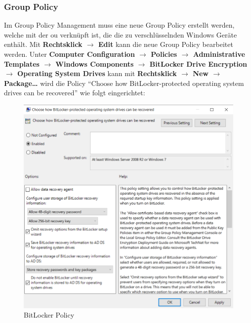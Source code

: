 \subsubsection{Group Policy}
Im Group Policy Management muss eine neue Group Policy erstellt werden, welche mit der \acrshort{ou} verknüpft ist, die die zu verschlüsselnden Windows Geräte enthält.
Mit \textbf{Rechtsklick $\rightarrow$ Edit} kann die neue Group Policy bearbeitet werden.
Unter \textbf{Computer Configuration $\rightarrow$ Policies $\rightarrow$ Administrative Templates $\rightarrow$ Windows Components $\rightarrow$ BitLocker Drive Encryption $\rightarrow$ Operating System Drives} kann mit \textbf{Rechtsklick $\rightarrow$ New $\rightarrow$ Package\dots} wird die Policy ``Choose how BitLocker-protected operating system drives can be recovered'' wie folgt eingerichtet:
\begin{figure}[H]
    \centering
    \includegraphics[width=\linewidth]{../img/Encryption/store-bitlocker-in-ad.png}
    \caption{BitLocker Policy}
\end{figure}

